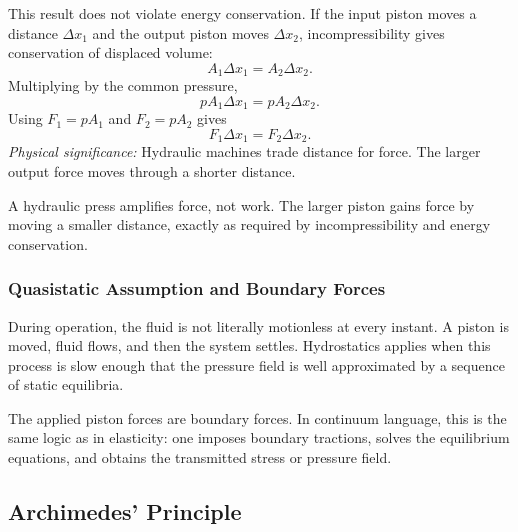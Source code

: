 \documentclass[../main.tex]{subfiles}
\begin{document}
This result does not violate energy conservation. If the input piston moves a distance $\Delta x_1$ and the output piston moves $\Delta x_2$, incompressibility gives conservation of displaced volume:
\begin{equation}
  A_1\Delta x_1=A_2\Delta x_2.
  \label{eq:lec11_volume_conservation_press}
\end{equation}
Multiplying by the common pressure,
\begin{equation}
  pA_1\Delta x_1=pA_2\Delta x_2.
  \label{eq:lec11_work_conservation_press_1}
\end{equation}
Using $F_1=pA_1$ and $F_2=pA_2$ gives
\begin{equation}
  \boxed{F_1\Delta x_1=F_2\Delta x_2.}
  \label{eq:lec11_work_conservation_press}
\end{equation}
\textit{Physical significance:} Hydraulic machines trade distance for force. The larger output force moves through a shorter distance.

\begin{note}
A hydraulic press amplifies force, not work. The larger piston gains force by moving a smaller distance, exactly as required by incompressibility and energy conservation.
\end{note}

\subsubsection{Quasistatic Assumption and Boundary Forces}\label{subsec:lec11:quasistatic-boundary}
During operation, the fluid is not literally motionless at every instant. A piston is moved, fluid flows, and then the system settles. Hydrostatics applies when this process is slow enough that the pressure field is well approximated by a sequence of static equilibria.

The applied piston forces are boundary forces. In continuum language, this is the same logic as in elasticity: one imposes boundary tractions, solves the equilibrium equations, and obtains the transmitted stress or pressure field.

\subsection{Archimedes' Principle}\label{sec:lec11:archimedes}
\end{document}

